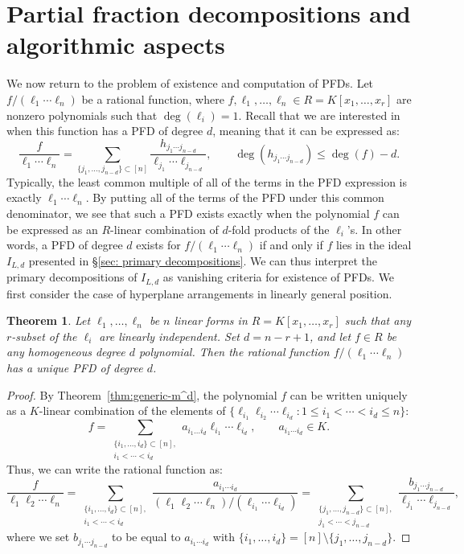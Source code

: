 \documentclass [a4paper,reqno, 11pt]{amsart}
\theoremstyle{plain}
\newtheorem{theorem}{Theorem}[section]
\theoremstyle{plain}
\theoremstyle{plain}
\theoremstyle{plain}
\theoremstyle{definition}
\theoremstyle{definition}
\theoremstyle{definition}
\theoremstyle{definition}
\theoremstyle{definition}
\theoremstyle{definition}
\begin{document}
\section{Partial fraction decompositions and algorithmic aspects}\label{sec: PFDs}

We now return to the problem of existence and computation of PFDs. Let $f/(\ell_1\cdots\ell_n)$ be a rational function, where $f,\ell_1,\ldots,\ell_n\in R=K[x_1,\ldots,x_r]$ are nonzero polynomials such that $\deg(\ell_i)=1$. Recall that we are interested in when this function has a PFD of degree $d$, meaning that it can be expressed as:
\begin{equation}\label{eqn:pfd secalgo}
    \frac{f}{\ell_1\cdots\ell_n}=\sum_{\{j_1,\ldots,j_{n-d}\}\subset[n]} \frac{h_{j_1\cdots j_{n-d}}}{\ell_{j_1}\cdots\ell_{j_{n-d}}},\qquad \deg(h_{j_1\cdots j_{n-d}})\leq \deg(f)-d.
\end{equation}
Typically, the least common multiple of all of the terms in the PFD expression is exactly $\ell_1\cdots\ell_n$. By putting all of the terms of the PFD under this common denominator, we see that such a PFD exists exactly when the polynomial $f$ can be expressed as an $R$-linear combination of $d$-fold products of the $\ell_i$'s. In other words, a PFD of degree $d$ exists for $f/(\ell_1\cdots\ell_n)$ if and only if $f$ lies in the ideal $I_{L,d}$ presented in \S\ref{sec: primary decompositions}. We can thus interpret the primary decompositions of $I_{L,d}$ as vanishing criteria for existence of PFDs.
We first consider the case of hyperplane arrangements in linearly general position.


\begin{theorem}\label{thm: generic PFD}
Let $\ell_1 ,\ldots, \ell_n$ be $n$ linear forms in \(R=K[x_1,\ldots,x_r]\) such that any $r$-subset of the \(\ell_i\) are linearly independent. Set \(d=n-r+1\), and let \(f\in R\) be any homogeneous degree \(d\) polynomial. Then the rational function $f/(\ell_1\cdots\ell_n)$
has a unique PFD of degree $d$.
\end{theorem}

\begin{proof}
    By Theorem~\ref{thm:generic-m^d}, the polynomial \(f\) can be written uniquely as a $K$-linear combination of the elements of \(\{\ell_{i_1}\ell_{i_2}\cdots\ell_{i_d}:1\leq i_1<\cdots<i_d\leq n\}\):
\[f=\sum_{\substack{\{i_1,\ldots, i_d\}\subset[n], \\ i_1<\cdots<i_d}}a_{i_1\ldots i_d}\ell_{i_1}\cdots\ell_{i_d},\qquad a_{i_1\cdots i_d}\in K.\]
Thus, we can write the rational function as:
\[\frac{f}{\ell_1\ell_2\cdots\ell_n}=\sum_{\substack{\{i_1,\ldots, i_{d}\}\subset[n], \\ i_1<\cdots<i_{d}}}\frac{a_{i_1\cdots i_d}}{(\ell_1\ell_2\cdots\ell_n)/(\ell_{i_1}\cdots\ell_{i_d})}=\sum_{\substack{\{j_1,\ldots, j_{n-d}\}\subset[n], \\ j_1<\cdots<j_{n-d}}}\frac{b_{j_1\cdots j_{n-d}}}{\ell_{j_1}\cdots\ell_{j_{n-d}}},\]
where we set \(b_{j_1\cdots j_{n-d}}\) to be equal to \(a_{i_1\cdots i_d}\) with \(\{i_1,\ldots, i_d\}=[n]\setminus\{j_1,\ldots,j_{n-d}\}\).
\end{proof}
\end{document}
